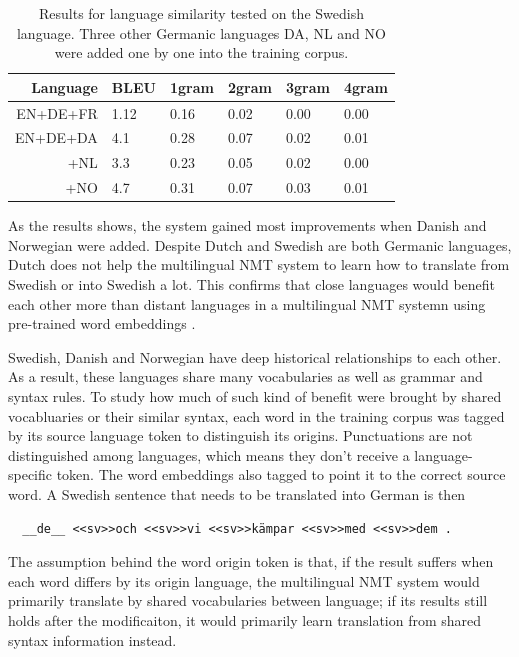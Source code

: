 \documentclass[thesis,fonts=libertine]{cluu}
\begin{document}
\begin{table}
  \centering
  \begin{tabular}{|r*{5}{|l}|}
  \hline
  Language & BLEU & 1gram & 2gram & 3gram & 4gram \\ [0.25ex]
  \hline\hline
  EN+DE+FR & 1.12 & 0.16 & 0.02 & 0.00 & 0.00 \\
  \hline
  EN+DE+DA & 4.1 & 0.28 & 0.07 & 0.02 & 0.01 \\
  \hline
  +NL & 3.3 & 0.23 & 0.05 & 0.02 & 0.00 \\ 
  \hline
  +NO & 4.7 & 0.31 & 0.07 & 0.03 & 0.01 \\
  \hline
  \end{tabular}
  \caption{Results for language similarity tested on the Swedish language. Three other Germanic languages DA, NL and NO were added one by one into the training corpus.}
  \label{table:language_similarity}
\end{table}

As the results shows, the system gained most improvements when Danish and Norwegian were added. Despite Dutch and Swedish are both Germanic languages, Dutch does not help the multilingual NMT system to learn how to translate from Swedish or into Swedish a lot. This confirms that close languages would benefit each other more than distant languages in a multilingual NMT systemn using pre-trained word embeddings \parencite{Qi:2018aa}.

Swedish, Danish and Norwegian have deep historical relationships to each other. As a result, these languages share many vocabularies as well as grammar and syntax rules. To study how much of such kind of benefit were brought by shared vocabluaries or their similar syntax, each word in the training corpus was tagged by its source language token to distinguish its origins. Punctuations are not distinguished among languages, which means they don't receive a language-specific token. The word embeddings also tagged to point it to the correct source word. A Swedish sentence that needs to be translated into German is then 

\begin{verbatim}
  __de__ <<sv>>och <<sv>>vi <<sv>>kämpar <<sv>>med <<sv>>dem .
\end{verbatim}

The assumption behind the word origin token is that, if the result suffers when each word differs by its origin language, the multilingual NMT system would primarily translate by shared vocabularies between language; if its results still holds after the modificaiton, it would primarily learn translation from shared syntax information instead.
\end{document}
